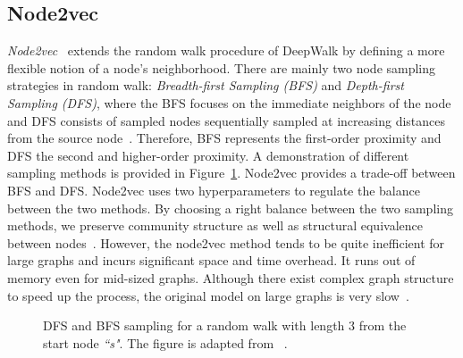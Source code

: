 \subsection{Node2vec}
\label{subsec:node2vec}
\emph{Node2vec}~ extends the random walk procedure of DeepWalk by defining a more flexible notion of a node’s neighborhood. There are mainly two node sampling strategies in random walk: \emph{Breadth-first Sampling (BFS)} and \emph{Depth-first Sampling (DFS)}, where the BFS focuses on the immediate neighbors of the node and DFS consists of sampled nodes sequentially sampled at increasing distances from the source node~.
Therefore, BFS represents the first-order proximity and DFS the second and higher-order proximity. A demonstration of different sampling methods is provided in Figure~\ref{fig:dfs_bfs}. Node2vec provides a trade-off between BFS and DFS. Node2vec uses two hyperparameters to regulate the balance between the two methods. By choosing a right balance between the two sampling methods, we preserve community structure as well as structural equivalence between nodes~.
However, the node2vec method tends to be quite inefficient for large graphs and incurs significant space and time overhead. It runs out of memory even for mid-sized graphs. Although there exist complex graph structure to speed up the process, the original model on large graphs is very slow~. 
\begin{figure}
\centering 
\resizebox{0.45\textwidth}{0.25\textwidth}{      

}
\caption{DFS and BFS sampling for a random walk with length $3$ from the start node \emph{``s"}. The figure is adapted from ~.}
\label{fig:dfs_bfs}
\end{figure}

